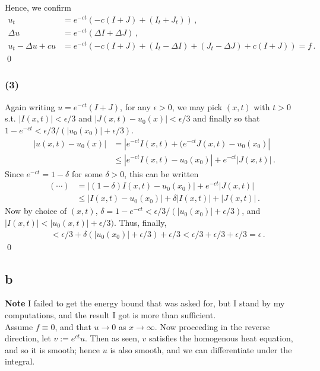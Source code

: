 \documentclass[11pt]{amsart}
\theoremstyle{definition}
\numberwithin{equation}{section}
\begin{document}
Hence, we confirm
\begin{align*}
u_t &= e^{-ct}(-c(I + J) + (I_t + J_t)) \,,\\
\Delta u &= e^{-ct}(\Delta I + \Delta J) \,,\\
u_t - \Delta u + c u
&=
e^{-ct}(
-c(I+J) + (I_t - \Delta I) + (J_t - \Delta J) + c(I+J)
)
= f\,.
\end{align*}
\qed
\subsubsection*{(3)}
Again writing $u = e^{-ct}(I + J)$, for any $\epsilon > 0$, we may pick $(x,t)$ with $t > 0$ s.t. $|I(x,t)| < \epsilon/3$ and $|J(x,t) - u_0(x)| < \epsilon/3$ and finally so that $1 - e^{-ct} < \epsilon/3/(|u_0(x_0)| + \epsilon/3)$.
\begin{align*}
|u(x,t) - u_0(x)|
&= 
|e^{-ct}I(x,t) + (e^{-ct}J(x,t) - u_0(x_0)| \\
&\leq |e^{-ct}I(x,t) - u_0(x_0)|
+ e^{-ct}|J(x,t)|\,.
\end{align*}
Since $e^{-ct} = 1 - \delta$ for some $\delta > 0$, this can be written
\begin{align*}
(\cdots) &=
|(1-\delta)I(x,t) - u_0(x_0)| + e^{-ct}|J(x,t)| \\
&\leq
|I(x,t) - u_0(x_0)| + \delta|I(x,t)| + |J(x,t)|\,.
\end{align*}
Now by choice of $(x,t)$, $\delta = 1 - e^{-ct} < \epsilon/3/(|u_0(x_0)| + \epsilon/3)$, and $|I(x,t)| < |u_0(x,t)| + \epsilon/3)$.
Thus, finally,
\begin{align*}
&< \epsilon/3
+ \delta
(|u_0(x_0)| + \epsilon/3) 
+ \epsilon/3
< \epsilon/3  + \epsilon/3 + \epsilon/3 = \epsilon\,.
\end{align*} \qed

\subsection*{b}
\textbf{Note}
I failed to get the energy bound that was asked for, but I stand by my computations, and the result I got is more than sufficient.
\\

\newcommand{\dx}{\mbox{d}x}
Assume $f \equiv 0$, and that $u \to 0$ as $x \to \infty$. Now proceeding in the reverse direction, let $v := e^{ct}u$. Then as seen, $v$ satisfies the homogenous heat equation, and so it is smooth; hence $u$ is also smooth, and we can differentiate under the integral.
\end{document}

